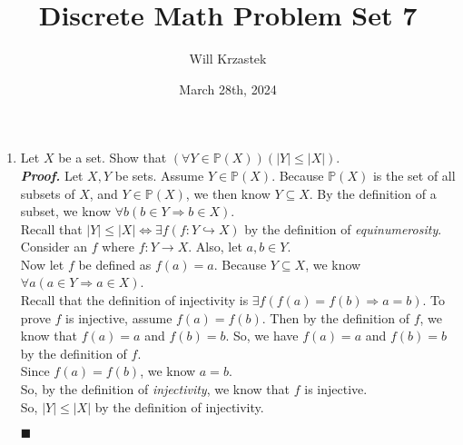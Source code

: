 \documentclass[11pt,a4paper]{article}
\begin{document}
 
\title{Discrete Math Problem Set 7}
\author{Will Krzastek}
\date{March 28th, 2024}
\maketitle

\begin{enumerate}

    \item 
    Let $X$ be a set. Show that $(\forall Y \in \mathbb{P}(X))(|Y| \leq |X|) $. \\
    \emph{\textbf{Proof.}} Let $X, Y $ be sets. Assume $Y \in \mathbb{P}(X) $. Because $\mathbb{P}(X) $ is the set of all subsets of $X$,
    and $Y \in \mathbb{P}(X) $, we then know $Y \subseteq X $. By the definition of a subset, we know $\forall b(b \in Y \Rightarrow b \in X) $. \\
    Recall that $|Y| \leq |X| \Leftrightarrow \exists f (f: Y \hookrightarrow X)$ by the definition of \emph{equinumerosity}. \\
    Consider an $f$ where $f: Y \rightarrow X $. Also, let $a, b \in Y$. \\
    Now let $f$ be defined as $ f(a) = a $. Because $Y \subseteq X $, we know $\forall a (a \in Y \Rightarrow a \in X) $. \\
    Recall that the definition of injectivity is $\exists f(f(a) = f(b) \Rightarrow a = b) $. To prove $f$ is injective, assume $f(a) = f(b) $.
    Then by the definition of $f$, we know that $f(a) = a $ and $f(b) = b $. 
    So, we have $f(a) = a $ and $f(b) = b $ by the definition of $f$. \\
    Since $f(a) = f(b)$, we know $a = b$.  \\
    So, by the definition of \emph{injectivity}, we know that $f$ is injective. \\ 
    So, $|Y| \leq |X| $ by the definition of injectivity.
    \begin{flushright}
        $\blacksquare$
    \end{flushright}


\end{enumerate}
\end{document}
